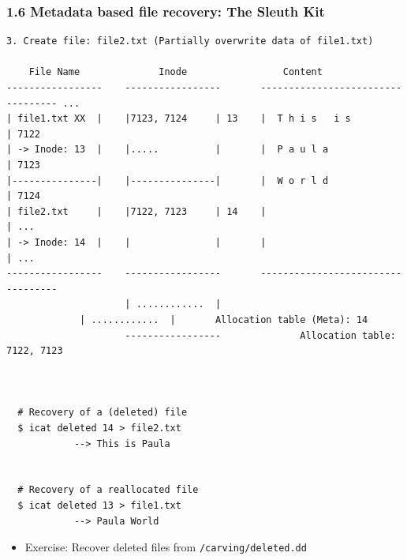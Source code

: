 \begin{frame}[fragile]
  \frametitle{1.6 Metadata based file recovery: The Sleuth Kit}
  \begin{lstlisting}[basicstyle=\tiny\ttfamily]
3. Create file: file2.txt (Partially overwrite data of file1.txt)

    File Name              Inode                 Content     
-----------------    -----------------       ---------------------------------- ...
| file1.txt XX  |    |7123, 7124     | 13    |  T h i s   i s                 | 7122
| -> Inode: 13  |    |.....          |       |  P a u l a                     | 7123
|---------------|    |---------------|       |  W o r l d                     | 7124
| file2.txt     |    |7122, 7123     | 14    |                                | ...
| -> Inode: 14  |    |               |       |                                | ...
-----------------    -----------------       ---------------------------------- 
                     | ............  |
		     | ............  |       Allocation table (Meta): 14
                     -----------------              Allocation table: 7122, 7123



  # Recovery of a (deleted) file
  $ icat deleted 14 > file2.txt
            --> This is Paula
 

  # Recovery of a reallocated file
  $ icat deleted 13 > file1.txt
            --> Paula World
  \end{lstlisting}
    \begin{itemize}
        \item[] Exercise: Recover deleted files from \texttt{/carving/deleted.dd}
    \end{itemize}
\end{frame}


